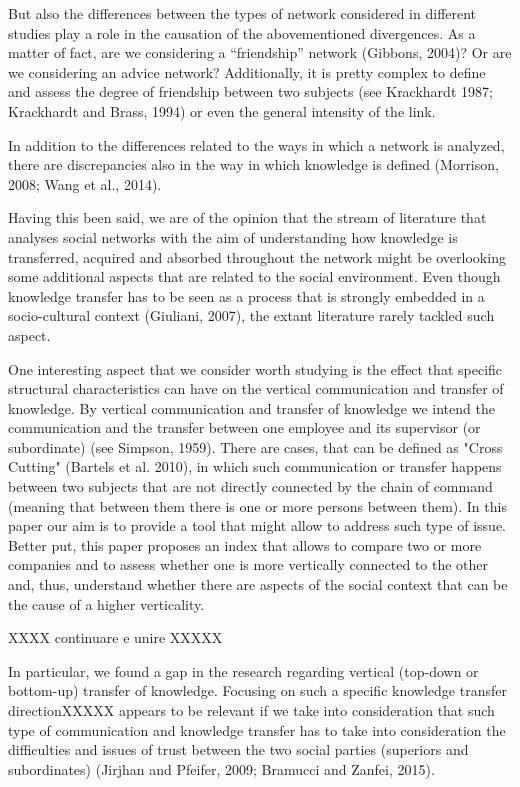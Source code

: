 \documentclass{article}
\begin{document}
But also the differences between the types of network considered in different studies play a role in the causation of the abovementioned divergences. As a matter of fact, are we considering a “friendship” network (Gibbons, 2004)? Or are we considering an advice network? Additionally, it is pretty complex to define and assess the degree of friendship between two subjects (see Krackhardt 1987; Krackhardt and Brass, 1994) or even the general intensity of the link.

In addition to the differences related to the ways in which a network is analyzed, there are discrepancies also in the way in which knowledge is defined (Morrison, 2008; Wang et al., 2014).

Having this been said, we are of the opinion that the stream of literature that analyses social networks with the aim of understanding how knowledge is transferred, acquired and absorbed throughout the network might be overlooking some additional aspects that are related to the social environment. Even though knowledge transfer has to be seen as a process that is strongly embedded in a socio-cultural context (Giuliani, 2007), the extant literature rarely tackled such aspect.

One interesting aspect that we consider worth studying is the effect that specific structural characteristics can have on the vertical communication and transfer of knowledge. By vertical communication and transfer of knowledge we intend the communication and the transfer between one employee and its supervisor (or subordinate) (see Simpson, 1959). There are cases, that can be defined as "Cross Cutting" (Bartels et al. 2010), in which such communication or transfer happens between two subjects that are not directly connected by the chain of command (meaning that between them there is one or more persons between them). 
In this paper our aim is to provide a tool that might allow to address such type of issue. Better put, this paper proposes an index that allows to compare two or more companies and to assess whether one is more vertically connected to the other and, thus, understand whether there are aspects of the social context that can be the cause of a higher verticality.

XXXX continuare e unire XXXXX

In particular, we found a gap in the research regarding vertical (top-down or bottom-up) transfer of knowledge. Focusing on such a specific knowledge transfer directionXXXXX appears to be relevant if we take into consideration that such type of communication and knowledge transfer has to take into consideration the difficulties and issues of trust between the two social parties (superiors and subordinates)  (Jirjhan and Pfeifer, 2009; Bramucci and Zanfei, 2015). 
\end{document}
